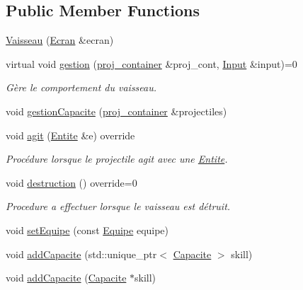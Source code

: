 \subsection*{Public Member Functions}
\begin{DoxyCompactItemize}
\item 
\mbox{\hyperlink{class_vaisseau_a91bee41b6575b4ee41128d7f6ad3ef88}{Vaisseau}} (\mbox{\hyperlink{class_ecran}{Ecran}} \&ecran)
\item 
virtual void \mbox{\hyperlink{class_vaisseau_aece43c3acf0e125226a03209f66c5eb4}{gestion}} (\mbox{\hyperlink{def__type_8h_a87980cd8ee9533e561a73e8bbc728188}{proj\+\_\+container}} \&proj\+\_\+cont, \mbox{\hyperlink{_input_8h_a5588d60d674991c719a8df848313e966}{Input}} \&input)=0
\begin{DoxyCompactList}\small\item\em Gère le comportement du vaisseau. \end{DoxyCompactList}\item 
void \mbox{\hyperlink{class_vaisseau_ad6127e3a4937ae6644fc7d370386c7b6}{gestion\+Capacite}} (\mbox{\hyperlink{def__type_8h_a87980cd8ee9533e561a73e8bbc728188}{proj\+\_\+container}} \&projectiles)
\item 
void \mbox{\hyperlink{class_vaisseau_a7950f1a06690d5f5eec5e38f3021a04c}{agit}} (\mbox{\hyperlink{class_entite}{Entite}} \&e) override
\begin{DoxyCompactList}\small\item\em Procédure lorsque le projectile agit avec une \mbox{\hyperlink{class_entite}{Entite}}. \end{DoxyCompactList}\item 
void \mbox{\hyperlink{class_vaisseau_a6d7506acb12c0367989066c899ec7949}{destruction}} () override=0
\begin{DoxyCompactList}\small\item\em Procedure a effectuer lorsque le vaisseau est détruit. \end{DoxyCompactList}\item 
void \mbox{\hyperlink{class_vaisseau_ac71b96473fe4f4e5f8543166029003ca}{set\+Equipe}} (const \mbox{\hyperlink{constantes_8h_a08fa5554288d5031a8f3bb83cc04ee83}{Equipe}} equipe)
\item 
void \mbox{\hyperlink{class_vaisseau_a49a366c2b72649ad942fd8aa896997bb}{add\+Capacite}} (std\+::unique\+\_\+ptr$<$ \mbox{\hyperlink{class_capacite}{Capacite}} $>$ skill)
\item 
void \mbox{\hyperlink{class_vaisseau_a04d7069231187e7dba26a06a0aaf2508}{add\+Capacite}} (\mbox{\hyperlink{class_capacite}{Capacite}} $\ast$skill)

\end{DoxyCompactItemize}
